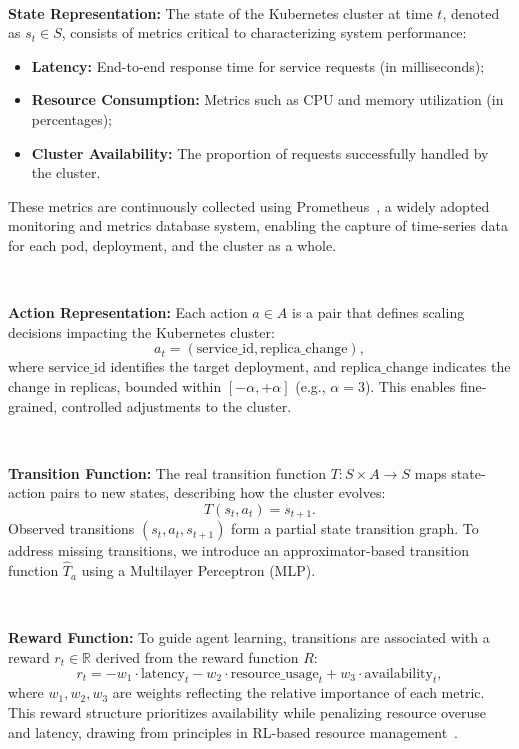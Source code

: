 \documentclass[conference]{IEEEtran}
\begin{document}
\

\noindent \textbf{State Representation:} The state of the Kubernetes cluster at time \( t \), denoted as \( s_t \in S \), consists of metrics critical to characterizing system performance:
\begin{itemize}
    \item \textbf{Latency:} End-to-end response time for service requests (in milliseconds);
    \item \textbf{Resource Consumption:} Metrics such as CPU and memory utilization (in percentages);
    \item \textbf{Cluster Availability:} The proportion of requests successfully handled by the cluster.
\end{itemize}
These metrics are continuously collected using Prometheus~\cite{prometheus}, a widely adopted monitoring and metrics database system, enabling the capture of time-series data for each pod, deployment, and the cluster as a whole.

\

\noindent \textbf{Action Representation:} Each action \( a \in A \) is a pair that defines scaling decisions impacting the Kubernetes cluster:
$$
a_t = (\text{service\_id}, \text{replica\_change}),
$$
where \( \text{service\_id} \) identifies the target deployment, and \( \text{replica\_change} \) indicates the change in replicas, bounded within \( [-\alpha, +\alpha] \) (e.g., \( \alpha = 3 \)). This enables fine-grained, controlled adjustments to the cluster.

\

\noindent \textbf{Transition Function:} The real transition function \( T: S \times A \to S \) maps state-action pairs to new states, describing how the cluster evolves:
$$
T(s_t, a_t) = s_{t+1}.
$$
Observed transitions \( (s_t, a_t, s_{t+1}) \) form a partial state transition graph. To address missing transitions, we introduce an approximator-based transition function \( \hat{T}_a \) using a Multilayer Perceptron (MLP).

\

\noindent \textbf{Reward Function:} To guide agent learning, transitions are associated with a reward \( r_t \in \mathbb{R} \) derived from the reward function \( R \):
$$
r_t = -w_1 \cdot \text{latency}_t - w_2 \cdot \text{resource\_usage}_t + w_3 \cdot \text{availability}_t,
$$
where \( w_1, w_2, w_3 \) are weights reflecting the relative importance of each metric. This reward structure prioritizes availability while penalizing resource overuse and latency, drawing from principles in RL-based resource management~\cite{Mao2019RL4RM}.
\end{document}
